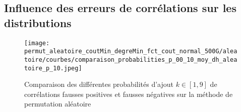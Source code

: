 \documentclass[onecolumn, 12pt]{book}
\begin{document}
\subsection{Influence des erreurs de corr\'elations sur les distributions}
\begin{figure}[htb!] 
\centering
\texttt{[image: permut\_aleatoire\_coutMin\_degreMin\_fct\_cout\_normal\_500G/aleatoire/courbes/comparaison\_probabilities\_p\_00\_10\_moy\_dh\_aleatoire\_p\_10.jpeg]}
\caption{ Comparaison des diff\'erentes probabilit\'es d'ajout $k \in [1,9]$ de corr\'elations fausses positives et fausses n\'egatives sur la m\'ethode de permutation al\'eatoire }
\label{compareDifferentesProbabilitesP0_1_fct_cout_unitaire_p05} 
\end{figure}

\end{document}
